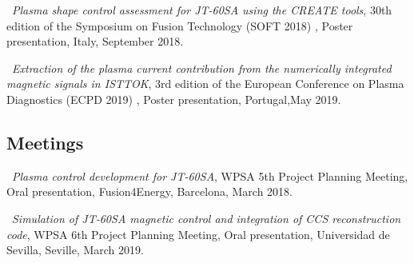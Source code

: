 \textbullet \, \textit{Plasma shape control assessment for JT-60SA using the CREATE tools}, 30th edition of the Symposium on Fusion Technology (SOFT 2018) , Poster presentation, Italy, September 2018. 
\smallskip

\textbullet \, \textit{Extraction of the plasma current contribution from the numerically integrated magnetic signals in ISTTOK}, 3rd edition of the European Conference on Plasma Diagnostics (ECPD 2019) , Poster presentation, Portugal,May 2019.

\subsection{Meetings}

\textbullet \, \textit{Plasma control development for JT-60SA}, WPSA 5th Project Planning Meeting, Oral presentation, Fusion4Energy, Barcelona, March 2018. 
\smallskip

\textbullet \, \textit{Simulation of JT-60SA magnetic control and integration of CCS reconstruction	code}, WPSA 6th Project Planning Meeting, Oral presentation, Universidad de Sevilla, Seville, March 2019. 



\vfill